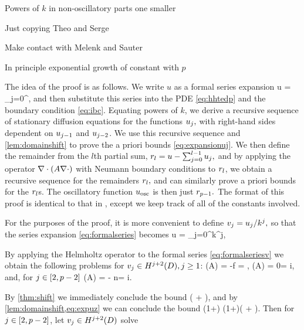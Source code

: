\enth

\bit
\item Powers of $k$ in non-oscillatory parts one smaller
\item Just copying Theo and Serge
\item Make contact with Melenk and Sauter
\item In principle exponential growth of constant with $p$
\eit

The idea of the proof is as follows. We write $u$ as a formal series expansion
\beq\label{eq:formalseries}
u = \sum_{j=0}^\infty \usj,
\eeq
and then substitute this series into the PDE \cref{eq:hhtedp} and the boundary condition \eqref{eq:ibc}. Equating powers of $k$, we derive a recursive sequence of stationary diffusion equations for the functions $u_{j},$ with right-hand sides dependent on $u_{j-1}$ and $u_{j-2}$. We use this recursive sequence and \cref{lem:domainshift} to prove the a priori bounds \cref{eq:expansionuj}. We then define the remainder from the $l$th partial sum, $r_{l} = u - \sum_{j=0}^{l-1} u_{j},$ and by applying the operator $\grad\cdot\mleft(A\grad \cdot\mright)$ with Neumann boundary conditions to $r_{l}$, we obtain a recursive sequence for the remainders $r_{l},$ and can similarly prove a priori bounds for the $r_{l}$s. The oscillatory function $u_{\mathrm{osc}}$ is then just $r_{p-1}.$ The format of this proof is identical to that in \cite[Theorem 1]{ChNi:18a}, except we keep track of all of the constants involved.

For the purposes of the proof, it is more convenient to define $v_{j} = u_{j}/k^j,$ so that the series expansion \cref{eq:formalseries} becomes
\beq\label{eq:formalseriesv}
u = \sum_{j=0}^\infty k^j\vj,
\eeq

By applying the Helmholtz operator to the formal series \eqref{eq:formalseriesv} we obtain the following problems for $\vj \in \HjptD, j \geq 1$:
\beqs
\grad \cdot \mleft(A\grad \vz\mright) = -f \quad\tand\quad \dn \vz = \gI,
\eeqs
\beqs
\grad \cdot \mleft(A\grad \vo\mright) = 0\quad\tand\quad\dn \vo = i\vz,
\eeqs
and, for $j \in \mleft[2,p-2\mright]$
\beqs
\grad \cdot \mleft(A\grad \vj\mright) = - n\vjmt\quad\tand\quad\dn \vz = i\vjmo.
\eeqs

By \cref{thm:shift} we immediately conclude the bound
\beq\label{eq:expuz}
\NHtD{\vz} \leq \CAz\mleft( + \NHhGI{\gI}\mright),
\eeq
and by \cref{lem:domainshift,eq:expuz} we can conclude the bound
\beqs
\NHthD{\vo} \leq \CAo \mleft(1+\CTrt\mright) \leq \CAz \CAo \mleft(1+\CTrt\mright)\mleft( + \NHhGI{\gI}\mright).
\eeqs
Then for $j \in \mleft[2,p-2\mright]$, let $\vj \in \HjptD$ solve

